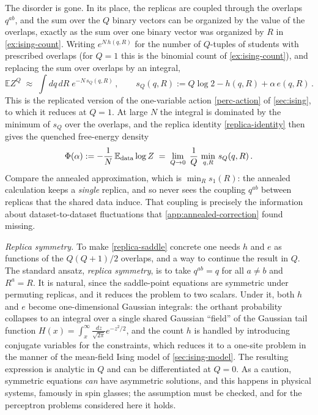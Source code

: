 \documentclass[11pt]{article}
\newcommand{\E}{\mathbb{E}}
\begin{document}
The disorder is gone. In its place, the replicas are coupled through the overlaps $q^{ab}$, and the sum over the $Q$ binary vectors can be organized by the value of the overlaps, exactly as the sum over one binary vector was organized by $R$ in \cref{ex:ising-count}. Writing $e^{N\,h(q,R)}$ for the number of $Q$-tuples of students with prescribed overlaps (for $Q=1$ this is the binomial count of \cref{ex:ising-count}), and replacing the sum over overlaps by an integral,
%
\begin{equation}
    \E Z^Q \;\approx\; \int dq\,dR\; e^{-N\,s_Q(q,R)}\,,\qquad s_Q(q,R) := Q\log 2 - h(q,R) + \alpha\,e(q,R)\,. \label{replica-action}
\end{equation}
%
This is the replicated version of the one-variable action \eqref{perc-action} of \cref{sec:ising}, to which it reduces at $Q=1$. At large $N$ the integral is dominated by the minimum of $s_Q$ over the overlaps, and the replica identity \eqref{replica-identity} then gives the quenched free-energy density
%
\begin{equation}
    \Phi(\alpha) := -\frac{1}{N}\,\E_{\rm data}\log Z \;=\; \lim_{Q\to0}\;\frac{1}{Q}\,\min_{q,R}\,s_Q(q,R)\,. \label{replica-saddle}
\end{equation}
%
Compare the annealed approximation, which is $\min_R s_1(R)$: the annealed calculation keeps a \emph{single} replica, and so never sees the coupling $q^{ab}$ between replicas that the shared data induce. That coupling is precisely the information about dataset-to-dataset fluctuations that \cref{app:annealed-correction} found missing.

\emph{Replica symmetry.} To make \eqref{replica-saddle} concrete one needs $h$ and $e$ as functions of the $Q(Q+1)/2$ overlaps, and a way to continue the result in $Q$. The standard ansatz, \emph{replica symmetry}, is to take $q^{ab} = q$ for all $a\neq b$ and $R^a = R$. It is natural, since the saddle-point equations are symmetric under permuting replicas, and it reduces the problem to two scalars. Under it, both $h$ and $e$ become one-dimensional Gaussian integrals: the orthant probability collapses to an integral over a single shared Gaussian ``field'' of the Gaussian tail function $H(x) = \int_x^\infty\frac{dz}{\sqrt{2\pi}}e^{-z^2/2}$, and the count $h$ is handled by introducing conjugate variables for the constraints, which reduces it to a one-site problem in the manner of the mean-field Ising model of \cref{sec:ising-model}. The resulting expression is analytic in $Q$ and can be differentiated at $Q=0$. As a caution, symmetric equations \emph{can} have asymmetric solutions, and this happens in physical systems, famously in spin glasses; the assumption must be checked, and for the perceptron problems considered here it holds.
\end{document}
